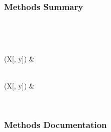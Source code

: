 \documentclass[letterpaper,10pt,english]{sphinxmanual}
\begin{document}
\begin{fulllineitems}
\begin{description}
\begin{description}
\end{description}

\end{description}
\subsubsection*{Methods Summary}


\begin{savenotes}\sphinxatlongtablestart\begin{longtable}[c]{}
\hline

\endfirsthead

%
{}\\
\hline

\endhead

\hline
{}\\
\endfoot

\endlastfoot

{\hyperref[\detokenize{api/mastml.feature_generators.OneHotElementEncoder:mastml.feature_generators.OneHotElementEncoder.fit}]{}}(X{[}, y{]})
&

\\
\hline
{\hyperref[\detokenize{api/mastml.feature_generators.OneHotElementEncoder:mastml.feature_generators.OneHotElementEncoder.transform}]{}}(X{[}, y{]})
&

\\
\hline
\end{longtable}\sphinxatlongtableend\end{savenotes}
\subsubsection*{Methods Documentation}

\begin{fulllineitems}
\label{\detokenize{api/mastml.feature_generators.OneHotElementEncoder:mastml.feature_generators.OneHotElementEncoder.fit}}
\end{fulllineitems}


\end{fulllineitems}
\end{document}
